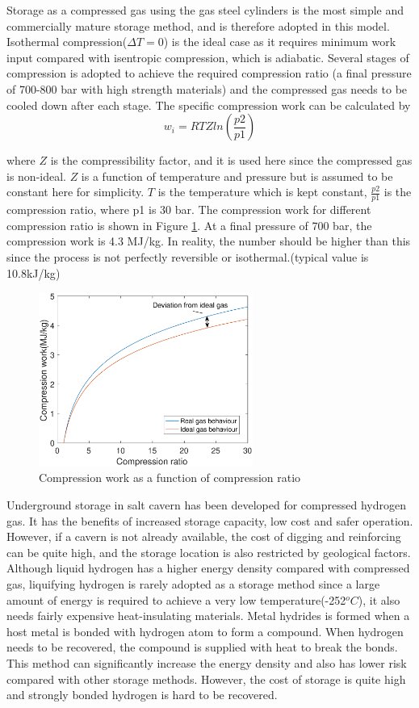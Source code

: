 Storage as a compressed gas using the gas steel cylinders is the most simple and commercially mature storage method, and is therefore adopted in this model. Isothermal compression($\Delta T = 0$) is the ideal case as it requires minimum work input compared with isentropic compression, which is adiabatic. Several stages of compression is adopted to achieve the required compression ratio (a final pressure of 700-800 bar with high strength materials) and the compressed gas needs to be cooled down after each stage.  The specific compression work can be calculated by \cite{gas}
\begin{equation}
w_i = RTZln(\frac{p2}{p1})
\end{equation}

where $Z$ is the compressibility factor, and it is used here since the compressed gas is non-ideal. $Z$  is a function of temperature and pressure but is assumed to be constant here for simplicity. $T$ is the temperature which is kept constant, $\frac{p2}{p1}$ is the compression ratio, where p1 is 30 bar. The compression work for different compression ratio is shown in Figure \ref{fig:compression}. At a final pressure of 700 bar, the compression work is 4.3 MJ/kg. In reality, the number should be higher than this since the process is not perfectly reversible or isothermal.(typical value is 10.8kJ/kg\cite{storage})

\begin{figure}[H]
\centering
\includegraphics[width=7cm]{compression.eps}
\caption{Compression work as a function of compression ratio}
\label{fig:compression}
\end{figure}

Underground storage in salt cavern has been developed for compressed hydrogen gas. It has the benefits of increased storage capacity, low cost and safer operation. However, if a cavern is not already available, the cost of digging and reinforcing can be quite high, and the storage location is also restricted by geological factors.\cite{cons} Although liquid hydrogen has a higher energy density compared with compressed gas, liquifying hydrogen is rarely adopted as a storage method since a large amount of energy is required to achieve a very low temperature(-252$^oC$), it also needs fairly expensive heat-insulating materials. Metal hydrides is formed when a host metal is bonded with hydrogen atom to form a compound. When hydrogen needs to be recovered, the compound is supplied with heat to break the bonds. This method can significantly increase the energy density and also has lower risk compared with other storage methods. However, the cost of storage is quite high and strongly bonded hydrogen is hard to be recovered.\cite{storage3}


